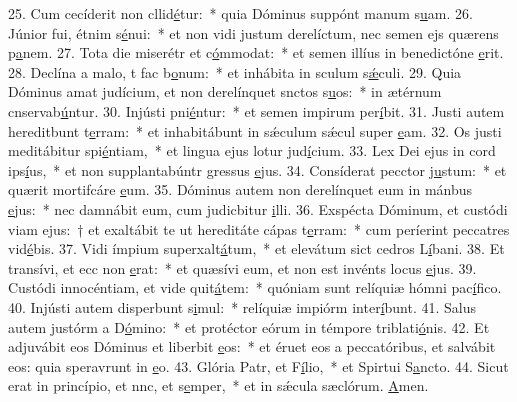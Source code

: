 25. Cum cecíderit non cllid\uline{é}tur:~* quia Dóminus suppónt manum s\uline{u}am.
26. Júnior fui, étnim s\uline{é}nui:~* et non vidi justum derelíctum, nec semen ejs quærens p\uline{a}nem.
27. Tota die miserétr et c\uline{ó}mmodat:~* et semen illíus in benedictóne \uline{e}rit.
28. Declína a malo, t fac b\uline{o}num:~* et inhábita in sculum s\uline{ǽ}culi.
29. Quia Dóminus amat judícium, et non derelínquet snctos s\uline{u}os:~* in ætérnum cnservab\uline{ú}ntur.
30. Injústi pni\uline{é}ntur:~* et semen impirum per\uline{í}bit.
31. Justi autem hereditbunt t\uline{e}rram:~* et inhabitábunt in sǽculum sǽcul super \uline{e}am.
32. Os justi meditábitur spi\uline{é}ntiam,~* et lingua ejus lotur jud\uline{í}cium.
33. Lex Dei ejus in cord ips\uline{í}us,~* et non supplantabúntr gressus \uline{e}jus.
34. Consíderat pecctor j\uline{u}stum:~* et quærit mortifcáre \uline{e}um.
35. Dóminus autem non derelínquet eum in mánbus \uline{e}jus:~* nec damnábit eum, cum judicbitur \uline{i}lli.
36. Exspécta Dóminum, et custódi viam ejus:~† et exaltábit te ut hereditáte cápas t\uline{e}rram:~* cum períerint peccatres vid\uline{é}bis.
37. Vidi ímpium superxalt\uline{á}tum,~* et elevátum sict cedros L\uline{í}bani.
38. Et transívi, et ecc non \uline{e}rat:~* et quæsívi eum, et non est invénts locus \uline{e}jus.
39. Custódi innocéntiam, et vide quit\uline{á}tem:~* quóniam sunt relíquiæ hómni pac\uline{í}fico.
40. Injústi autem disperbunt s\uline{i}mul:~* relíquiæ impiórm inter\uline{í}bunt.
41. Salus autem justórm a D\uline{ó}mino:~* et protéctor eórum in témpore triblati\uline{ó}nis.
42. Et adjuvábit eos Dóminus et liberbit \uline{e}os:~* et éruet eos a peccatóribus, et salvábit eos: quia speravrunt in \uline{e}o.
43. Glória Patr, et F\uline{í}lio,~* et Spirtui S\uline{a}ncto.
44. Sicut erat in princípio, et nnc, et s\uline{e}mper,~* et in sǽcula sæclórum. \uline{A}men.
